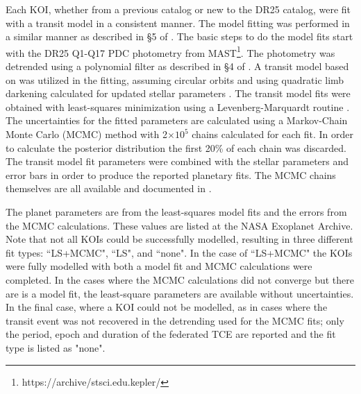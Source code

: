 \label{s:mcmc}

Each KOI, whether from a previous catalog or new to the DR25 catalog, were fit with a transit model in a consistent manner. The model fitting was performed in a similar manner as described in \S5 of \citet{Rowe2015cat}. The basic steps to do the model fits start with the DR25 Q1-Q17 PDC photometry from MAST\footnote{https://archive/stsci.edu.kepler/}. The photometry was detrended using a polynomial filter as described in \S4 of \citet{Rowe2014}. A transit model based on \citet{Mandel2002} was utilized in the fitting, assuming circular orbits and using quadratic limb darkening \citep{Claret2011} calculated for updated stellar parameters \citep{Mathur2017}. The transit model fits were obtained with least-squares minimization using a Levenberg-Marquardt routine \citep{More1980}. The uncertainties for the fitted parameters are calculated using a Markov-Chain Monte Carlo (MCMC) method \citep{Ford2005AJ} with 2$\times 10^{5}$ chains calculated for each fit. In order to calculate the posterior distribution the first 20\% of each chain was discarded. The transit model fit parameters were combined with the stellar parameters and error bars \citep{Mathur2017} in order to produce the reported planetary fits. The MCMC chains themselves are all available and documented in \citet{Hoffman2017}. 

The planet parameters are from the least-squares model fits and the errors from the MCMC calculations. These values are listed at the NASA Exoplanet Archive. Note that not all KOIs could be successfully modelled, resulting in three different fit types: ``LS+MCMC", ``LS", and ``none". In the case of ``LS+MCMC" the KOIs were fully modelled with both a model fit and MCMC calculations were completed. In the cases where the MCMC calculations did not converge but there are is a model fit, the least-square parameters are available without uncertainties. In the final case, where a KOI could not be modelled, as in cases where the transit event was not recovered in the detrending used for the MCMC fits; only the period, epoch and duration of the federated TCE are reported and the fit type is listed as "none".